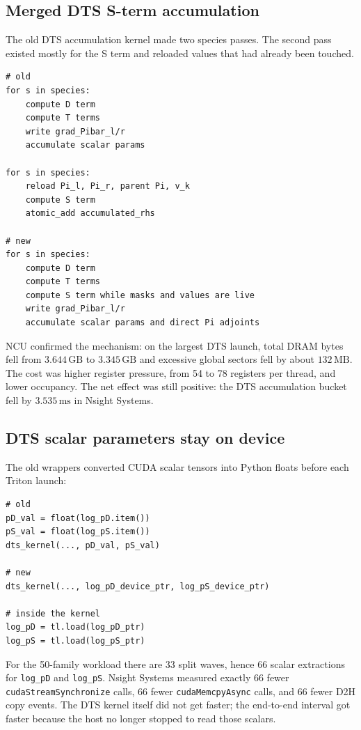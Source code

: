 \documentclass[11pt]{article}
\newcommand{\ms}{\,\mathrm{ms}}
\newcommand{\gb}{\,\mathrm{GB}}
\newcommand{\mb}{\,\mathrm{MB}}
\newcommand{\code}[1]{\texttt{#1}}
\begin{document}
\subsection{Merged DTS S-term accumulation}

The old DTS accumulation kernel made two species passes.  The second pass
existed mostly for the S term and reloaded values that had already been touched.

\begin{lstlisting}
# old
for s in species:
    compute D term
    compute T terms
    write grad_Pibar_l/r
    accumulate scalar params

for s in species:
    reload Pi_l, Pi_r, parent Pi, v_k
    compute S term
    atomic_add accumulated_rhs

# new
for s in species:
    compute D term
    compute T terms
    compute S term while masks and values are live
    write grad_Pibar_l/r
    accumulate scalar params and direct Pi adjoints
\end{lstlisting}

NCU confirmed the mechanism: on the largest DTS launch, total DRAM bytes fell
from $3.644\gb$ to $3.345\gb$ and excessive global sectors fell by about
$132\mb$.  The cost was higher register pressure, from 54 to 78 registers per
thread, and lower occupancy.  The net effect was still positive: the DTS
accumulation bucket fell by $3.535\ms$ in Nsight Systems.

\subsection{DTS scalar parameters stay on device}

The old wrappers converted CUDA scalar tensors into Python floats before each
Triton launch:

\begin{lstlisting}
# old
pD_val = float(log_pD.item())
pS_val = float(log_pS.item())
dts_kernel(..., pD_val, pS_val)

# new
dts_kernel(..., log_pD_device_ptr, log_pS_device_ptr)

# inside the kernel
log_pD = tl.load(log_pD_ptr)
log_pS = tl.load(log_pS_ptr)
\end{lstlisting}

For the 50-family workload there are 33 split waves, hence 66 scalar
extractions for \code{log\_pD} and \code{log\_pS}.  Nsight Systems measured
exactly 66 fewer \code{cudaStreamSynchronize} calls, 66 fewer
\code{cudaMemcpyAsync} calls, and 66 fewer D2H copy events.  The DTS kernel
itself did not get faster; the end-to-end interval got faster because the host
no longer stopped to read those scalars.
\end{document}
